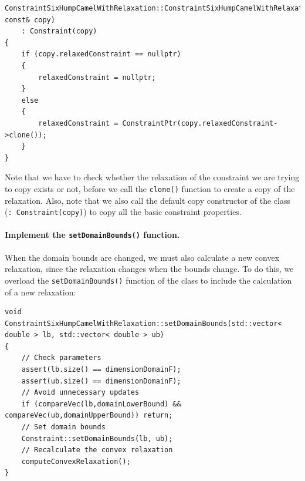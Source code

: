 \begin{lstlisting}
ConstraintSixHumpCamelWithRelaxation::ConstraintSixHumpCamelWithRelaxation(ConstraintSixHumpCamelWithRelaxation const& copy)
    : Constraint(copy)
{
	if (copy.relaxedConstraint == nullptr)
	{
		relaxedConstraint = nullptr;
	}
	else
	{
		relaxedConstraint = ConstraintPtr(copy.relaxedConstraint->clone());
	}
}
\end{lstlisting}
Note that we have to check whether the relaxation of the constraint we are trying to copy exists or not, before we call the \texttt{clone()} function to create a copy of the relaxation. Also, note that we also call the default copy constructor of the  class (\texttt{: Constraint(copy)}) to copy all the basic constraint properties.

\paragraph{Implement the \texttt{setDomainBounds()} function.} When the domain bounds are changed, we must also calculate a new convex relaxation, since the relaxation changes when the bounds change. To do this, we overload the \texttt{setDomainBounds()} function of the  class to include the calculation of a new relaxation:
\begin{lstlisting}
void ConstraintSixHumpCamelWithRelaxation::setDomainBounds(std::vector< double > lb, std::vector< double > ub)
{
	// Check parameters
	assert(lb.size() == dimensionDomainF);
	assert(ub.size() == dimensionDomainF);
	// Avoid unnecessary updates
	if (compareVec(lb,domainLowerBound) && compareVec(ub,domainUpperBound)) return;
	// Set domain bounds
	Constraint::setDomainBounds(lb, ub);
	// Recalculate the convex relaxation
	computeConvexRelaxation();
}
\end{lstlisting}

